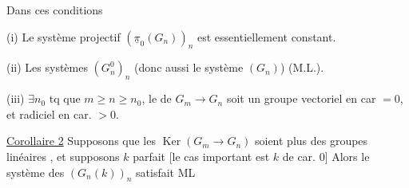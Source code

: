 
Dans ces conditions

(i) Le système projectif $(\underline{\pi}_0(G_n))_n$ est essentiellement constant.

(ii) Les systèmes $(G_n^0)_n$ (donc aussi le système $(G_n)$)  (M.L.).

(iii)   $\exists n_0$ tq  que  $m\geq n\geq n_0$, le  de $G_m\longrightarrow G_n$ soit un groupe vectoriel  en car $=0$, et  radiciel en car. $>0$.



\uline{Corollaire 2} Supposons que les $\operatorname{Ker}(G_m\rightarrow G_n)$  soient \deleted{$=$} plus des groupes  linéaires ,  et supposons $k$ parfait [le cas important est $k$ de car. 0] Alors le système des $(G_n(k))_n$ satisfait ML

